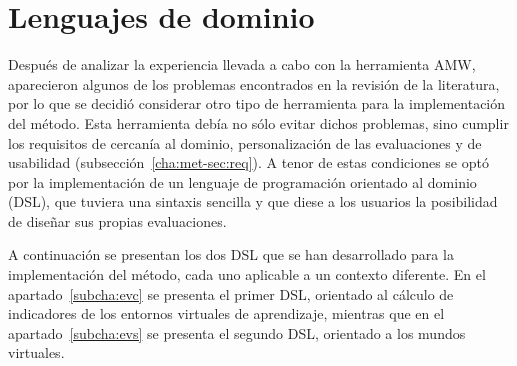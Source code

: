 \section{Lenguajes de dominio}

	Después de analizar la experiencia llevada a cabo con la herramienta AMW, aparecieron algunos de los problemas encontrados en la revisión de la literatura, por lo que se decidió considerar otro tipo de herramienta para la implementación del método. Esta herramienta debía no sólo evitar dichos problemas, sino cumplir los requisitos de cercanía al dominio, personalización de las evaluaciones y de usabilidad (subsección~\ref{cha:met-sec:req}). A tenor de estas condiciones se optó por la implementación de un lenguaje de programación orientado al dominio (DSL), que tuviera una sintaxis sencilla y que diese a los usuarios la posibilidad de diseñar sus propias evaluaciones.

		A continuación se presentan los dos DSL que se han desarrollado para la implementación del método, cada uno aplicable a un contexto diferente. En el apartado~\ref{subcha:evc} se presenta el primer DSL, orientado al cálculo de indicadores de los entornos virtuales de aprendizaje, mientras que en el apartado~\ref{subcha:evs} se presenta el segundo DSL, orientado a los mundos virtuales.





